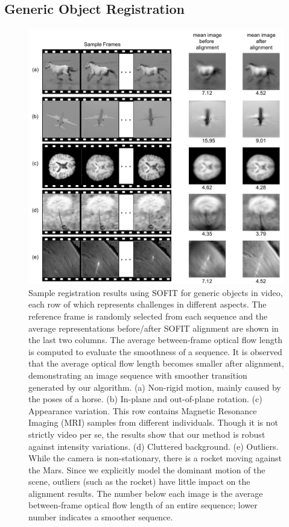\documentclass[review]{elsarticle}
\begin{document}
\subsection{Generic Object Registration}


\begin{figure}[htbp]
	\centering
	\includegraphics[width=.65\textwidth]{fig/object_ex.png}
	\caption{Sample registration results using SOFIT for generic objects in video, each row of which represents challenges in different aspects. The reference frame is randomly selected from each sequence and the average representations before/after SOFIT alignment are shown in the last two columns. The average between-frame optical flow length is computed to evaluate the smoothness of a sequence. It is observed that the average optical flow length becomes smaller after alignment, demonstrating an image sequence with smoother transition generated by our algorithm. (a) Non-rigid motion, mainly caused by the poses of a horse. (b) In-plane and out-of-plane rotation. (c) Appearance variation. This row contains Magnetic Resonance Imaging (MRI) samples from different individuals. Though it is not strictly video per se, the results show that our method is robust against intensity variations. (d) Cluttered background. (e) Outliers. While the camera is non-stationary, there is a rocket moving against the Mars. Since we explicitly model the dominant motion of the scene, outliers (such as the rocket) have little impact on the alignment results. The number below each image is the average between-frame optical flow length of an entire sequence; lower number indicates a smoother sequence.}
	\label{fig:object_ex}
\end{figure}
\end{document}
